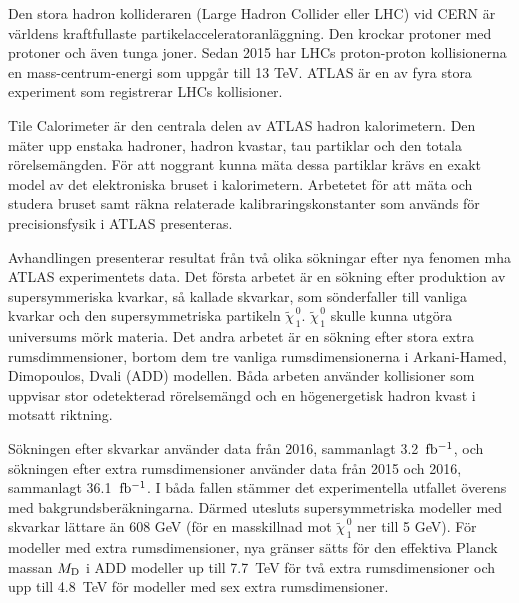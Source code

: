 Den stora hadron kollideraren (Large Hadron Collider eller LHC) vid CERN är
världens kraftfullaste partikelacceleratoranläggning. Den krockar protoner med
protoner och även tunga joner. Sedan 2015 har LHCs proton-proton kollisionerna
en mass-centrum-energi som uppgår till 13 TeV. ATLAS är en av fyra stora
experiment som registrerar LHCs kollisioner.

Tile Calorimeter är den centrala delen av ATLAS hadron kalorimetern. Den mäter
upp enstaka hadroner, hadron kvastar, tau partiklar och den totala
rörelsemängden. För att noggrant kunna mäta dessa partiklar krävs en exakt model
av det elektroniska bruset i kalorimetern. Arbetetet för att mäta och studera
bruset samt räkna relaterade kalibraringskonstanter som används för
precisionsfysik i ATLAS presenteras.

Avhandlingen presenterar resultat från två olika sökningar efter nya fenomen mha
ATLAS experimentets data. Det första arbetet är en sökning efter produktion av
supersymmeriska kvarkar, så kallade skvarkar, som sönderfaller till vanliga
kvarkar och den supersymmetriska partikeln $\tilde{\chi}_{\, 1}^{\,
  0}$. $\tilde{\chi}_{\, 1}^{\, 0}$ skulle kunna utgöra universums mörk
materia. Det andra arbetet är en sökning efter stora extra rumsdimmensioner,
bortom dem tre vanliga rumsdimensionerna i Arkani-Hamed, Dimopoulos, Dvali (ADD)
modellen. Båda arbeten använder kollisioner som uppvisar stor odetekterad
rörelsemängd och en högenergetisk hadron kvast i motsatt riktning.

Sökningen efter skvarkar använder data från 2016, sammanlagt 3.2~$\mbox{fb$^{-1}$}$, och
sökningen efter extra rumsdimensioner använder data från 2015 och 2016,
sammanlagt 36.1~$\mbox{fb$^{-1}$}$. I båda fallen stämmer det experimentella utfallet
överens med bakgrundsberäkningarna. Därmed utesluts supersymmetriska modeller
med skvarkar lättare än 608 GeV (för en masskillnad mot
$\tilde{\chi}_{\, 1}^{\, 0}$ ner till 5 GeV). För modeller med extra
rumsdimensioner, nya gränser sätts för den effektiva Planck massan $M_\mathrm{D}$ i ADD
modeller up till 7.7~TeV för två extra rumsdimensioner och upp till 4.8~TeV för
modeller med sex extra rumsdimensioner.
